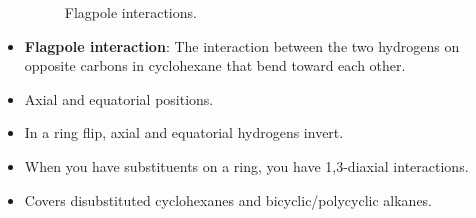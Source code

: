 \documentclass[../notes.tex]{subfiles}
\begin{document}
\begin{itemize}
\begin{itemize}
    \end{itemize}
    \begin{figure}[h!]
        \centering
        \footnotesize
        \caption{Flagpole interactions.}
        \label{fig:flagpoleInteraction}
    \end{figure}
    \item \textbf{Flagpole interaction}: The interaction between the two hydrogens on opposite carbons in cyclohexane that bend toward each other.
    \item Axial and equatorial positions.
    \item In a ring flip, axial and equatorial hydrogens invert.
    \item When you have substituents on a ring, you have 1,3-diaxial interactions.
    \item {}Covers disubstituted cyclohexanes and bicyclic/polycyclic alkanes.
\end{itemize}
\end{document}
